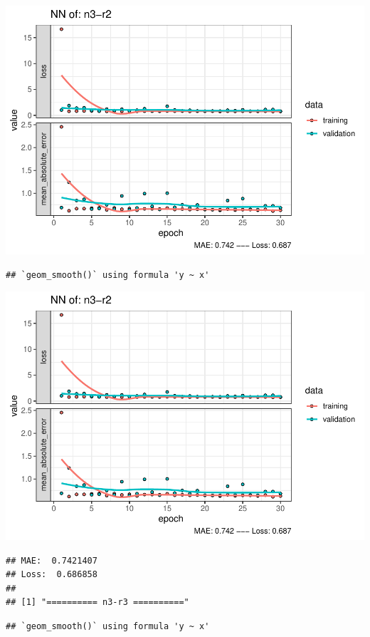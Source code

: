 \documentclass[
]{article}
\begin{document}
\includegraphics{project-code_files/figure-latex/unnamed-chunk-18-25.pdf}

\begin{verbatim}
## `geom_smooth()` using formula 'y ~ x'
\end{verbatim}

\includegraphics{project-code_files/figure-latex/unnamed-chunk-18-26.pdf}

\begin{verbatim}
## MAE:  0.7421407
## Loss:  0.686858 
## 
## [1] "========== n3-r3 =========="
\end{verbatim}

\begin{verbatim}
## `geom_smooth()` using formula 'y ~ x'
\end{verbatim}
\end{document}
